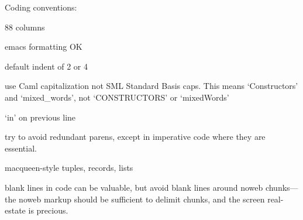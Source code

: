 Coding conventions:

  88 columns

  emacs formatting OK

  default indent of 2 or 4

  use Caml capitalization not SML Standard Basis caps.
  This means `Constructors' and `mixed_words', not `CONSTRUCTORS' or `mixedWords'

  `in' on previous line

  try to avoid redundant parens, except in imperative code where they
  are essential.

  macqueen-style tuples, records, lists

  blank lines in code can be valuable, but avoid blank lines around
  noweb chunks---the noweb markup should be sufficient to delimit
  chunks, and the screen real-estate is precious.